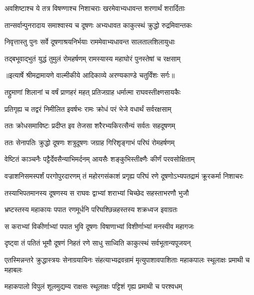 \twolineshloka
{अवशिष्टाश्च ये तत्र विषण्णाश्च निशाचराः}
{खरमेवाभ्यधावन्त शरणार्थं शरार्दिताः} %

\twolineshloka
{तान्सर्वान्पुनरादाय समाश्वास्य च दूषणः}
{अभ्यधावत काकुत्स्थं क्रुद्धो रुद्रमिवान्तकः} %

\twolineshloka
{निवृत्तास्तु पुनः सर्वे दूषणाश्रयनिर्भयाः}
{राममेवाभ्यधावन्त सालतालशिलायुधाः} %

\twolineshloka
{तद्बभूवाद्भुतं युद्धं तुमुलं रोमहर्षणम्}
{रामस्यास्य महाघोरं पुनस्तेषां च रक्षसाम्} %


{॥इत्यार्षे श्रीमद्रामायणे वाल्मीकीये आदिकाव्ये अरण्यकाण्डे चतुर्विंशः सर्गः॥}


\twolineshloka
{तद्द्रुमाणां शिलानां च वर्षं प्राणहरं महत्}
{प्रतिजग्राह धर्मात्मा राघवस्तीक्ष्णसायकैः} %

\twolineshloka
{प्रतिगृह्य च तद्वरं निमीलित इवर्षभः}
{रामः क्रोधं परं भेजे वधार्थं सर्वरक्षसाम्} %

\twolineshloka
{ततः क्रोधसमाविष्टः प्रदीप्त इव तेजसा}
{शरैरभ्यकिरत्सैन्यं सर्वतः सहदूषणम्} %

\twolineshloka
{ततः सेनापतिः क्रुद्धो दूषणः शत्रुदूषणः}
{जग्राह गिरिशृङ्गाभं परिघं रोमहर्षणम्} %

\twolineshloka
{वेष्टितं काञ्चनैः पट्टैर्देवसैन्याभिमर्दनम्}
{आयसैः शङ्कुभिस्तीक्ष्णैः कीर्णं परवसोक्षिताम्} %

\threelineshloka
{वज्राशनिसमस्पर्शं परगोपुरदारणम्}
{तं महोरगसंकाशं प्रगृह्य परिघं रणे}
{दूषणोऽभ्यपतद्रामं क्रूरकर्मा निशाचरः} %

\twolineshloka
{तस्याभिपतमानस्य दूषणस्य स राघवः}
{द्वाभ्यां शराभ्यां चिच्छेद सहस्ताभरणौ भुजौ} %

\twolineshloka
{भ्रष्टस्तस्य महाकायः पपात रणमूर्धनि}
{परिघश्छिन्नहस्तस्य शक्रध्वज इवाग्रतः} %

\twolineshloka
{स कराभ्यां विकीर्णाभ्यां पपात भुवि दूषणः}
{विषाणाभ्यां विशीर्णाभ्यां मनस्वीव महागजः} %

\twolineshloka
{दृष्ट्वा तं पतितं भूमौ दूषणं निहतं रणे}
{साधु साध्विति काकुत्स्थं सर्वभूतान्यपूजयन्} %

\threelineshloka
{एतस्मिन्नन्तरे क्रुद्धास्त्रयः सेनाग्रयायिनः}
{संहत्याभ्यद्रवन्रामं मृत्युपाशावपाशिताः}
{महाकपालः स्थूलाक्षः प्रमाथी च महाबलः} %

\twolineshloka
{महाकपालो विपुलं शूलमुद्यम्य राक्षसः}
{स्थूलाक्षः पट्टिशं गृह्य प्रमाथी च परश्वधम्} %

